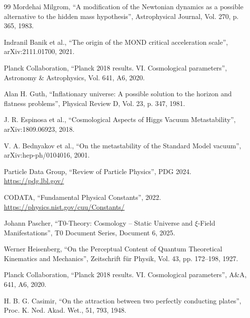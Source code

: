 \begin{thebibliography}{99}
		 Mordehai Milgrom, ``A modification of the Newtonian dynamics as a possible alternative to the hidden mass hypothesis'', Astrophysical Journal, Vol. 270, p. 365, 1983.
		
		 Indranil Banik et al., ``The origin of the MOND critical acceleration scale'', arXiv:2111.01700, 2021.
		
		 Planck Collaboration, ``Planck 2018 results. VI. Cosmological parameters'', Astronomy \& Astrophysics, Vol. 641, A6, 2020.
		
		 Alan H. Guth, ``Inflationary universe: A possible solution to the horizon and flatness problems'', Physical Review D, Vol. 23, p. 347, 1981.
		
		 J. R. Espinosa et al., ``Cosmological Aspects of Higgs Vacuum Metastability'', arXiv:1809.06923, 2018.
		
		 V. A. Bednyakov et al., ``On the metastability of the Standard Model vacuum'', arXiv:hep-ph/0104016, 2001.
		
		 Particle Data Group, ``Review of Particle Physics'', PDG 2024. \url{https://pdg.lbl.gov/}
		
		 CODATA, ``Fundamental Physical Constants'', 2022. \url{https://physics.nist.gov/cuu/Constants/}
		
		 Johann Pascher, ``T0-Theory: Cosmology – Static Universe and $\xi$-Field Manifestations'', T0 Document Series, Document 6, 2025. 
		
		 Werner Heisenberg, ``On the Perceptual Content of Quantum Theoretical Kinematics and Mechanics'', Zeitschrift für Physik, Vol. 43, pp. 172–198, 1927.
		
		 Planck Collaboration, ``Planck 2018 results. VI. Cosmological parameters'', A\&A, 641, A6, 2020.
		
		 H. B. G. Casimir, ``On the attraction between two perfectly conducting plates'', Proc. K. Ned. Akad. Wet., 51, 793, 1948.
		
	\end{thebibliography}
